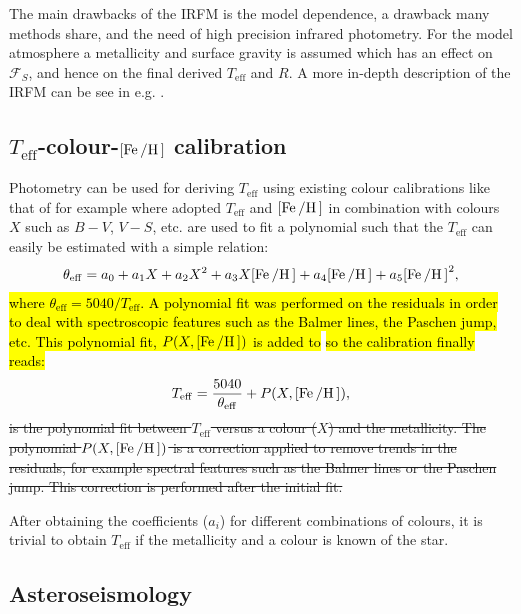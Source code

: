 The main drawbacks of the IRFM is the model dependence, a drawback many methods share, and the need
of high precision infrared photometry. For the model atmosphere a metallicity and surface gravity is
assumed which has an effect on $\mathcal{F}_S$, and hence on the final derived $T_\mathrm{eff}$ and
$R$. A more in-depth description of the IRFM can be see in e.g. \citet[][section 4]{Casagrande2006}.


\subsection{\texorpdfstring{$T_\mathrm{eff}$}{Teff}-colour-\texorpdfstring{$[\ion{Fe}/\ion{H}]$}{[Fe/H]} calibration}

Photometry can be used for deriving $T_\mathrm{eff}$ using existing colour calibrations like that of
for example \citet{Ramirez2005a} where adopted $T_\mathrm{eff}$ and $[\ion{Fe}/\ion{H}]$ in
combination with colours $X$ such as $B-V$, $V-S$, etc. are used to fit a polynomial such that the
$T_\mathrm{eff}$ can easily be estimated with a simple relation:
\begin{align}
  \theta_\mathrm{eff} = a_0+a_1 X+a_2 X^2+a_3X[\ion{Fe}/\ion{H}] + a_4[\ion{Fe}/\ion{H}] + a_5[\ion{Fe}/\ion{H}]^2, \label{eq:irfm}
\end{align}
\hl{where $\theta_\mathrm{eff}=5040/T_\mathrm{eff}$. A polynomial fit was performed on the residuals
in order to deal with spectroscopic features such as the Balmer lines, the Paschen jump, etc. This
polynomial fit, $P(X, [\ion{Fe}/\ion{H}])$ is added to}  \hl{so the calibration
finally reads:}
\begin{align}
  T_\mathrm{eff} = \frac{5040}{\theta_\mathrm{eff}} + P(X, [\ion{Fe}/\ion{H}]),
\end{align}
\st{is the polynomial fit between $T_\mathrm{eff}$ versus a colour ($X$) and the metallicity. The
polynomial $P(X, [\ion{Fe}/\ion{H}])$ is a correction applied to remove trends in the residuals, for
example spectral features such as the Balmer lines or the Paschen jump. This correction is performed
after the initial fit.}

After obtaining the coefficients ($a_i$) for different combinations of colours, it is trivial to
obtain $T_\mathrm{eff}$ if the metallicity and a colour is known of the star.

\subsection{Asteroseismology}

